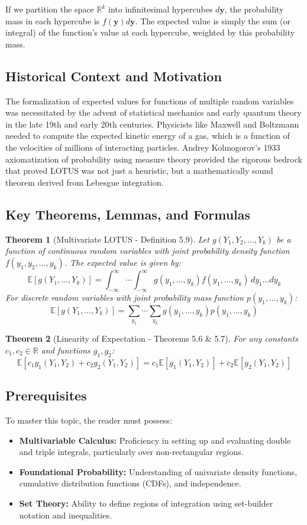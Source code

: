 \documentclass[11pt, a4paper]{article}
\newtheorem{theorem}{Theorem}[section]
\theoremstyle{definition}
\theoremstyle{remark}
\newcommand{\R}{\mathbb{R}}
\newcommand{\E}{\mathbb{E}}
\begin{document}
If we partition the space $\R^k$ into infinitesimal hypercubes $d\mathbf{y}$, the probability mass in each hypercube is $f(\mathbf{y})d\mathbf{y}$. The expected value is simply the sum (or integral) of the function's value at each hypercube, weighted by this probability mass.

\subsection{Historical Context and Motivation}
The formalization of expected values for functions of multiple random variables was necessitated by the advent of statistical mechanics and early quantum theory in the late 19th and early 20th centuries. Physicists like Maxwell and Boltzmann needed to compute the expected kinetic energy of a gas, which is a function of the velocities of millions of interacting particles. Andrey Kolmogorov's 1933 axiomatization of probability using measure theory provided the rigorous bedrock that proved LOTUS was not just a heuristic, but a mathematically sound theorem derived from Lebesgue integration.

\subsection{Key Theorems, Lemmas, and Formulas}
\begin{theorem}[Multivariate LOTUS - Definition 5.9]
Let $g(Y_1, Y_2, \dots, Y_k)$ be a function of continuous random variables with joint probability density function $f(y_1, y_2, \dots, y_k)$. The expected value is given by:
\[
\E[g(Y_1, \dots, Y_k)] = \int_{-\infty}^{\infty} \cdots \int_{-\infty}^{\infty} g(y_1, \dots, y_k) f(y_1, \dots, y_k) \, dy_1 \dots dy_k
\]
For discrete random variables with joint probability mass function $p(y_1, \dots, y_k)$:
\[
\E[g(Y_1, \dots, Y_k)] = \sum_{y_1} \cdots \sum_{y_k} g(y_1, \dots, y_k) p(y_1, \dots, y_k)
\]
\end{theorem}

\begin{theorem}[Linearity of Expectation - Theorems 5.6 \& 5.7]
For any constants $c_1, c_2 \in \R$ and functions $g_1, g_2$:
\[
\E[c_1 g_1(Y_1, Y_2) + c_2 g_2(Y_1, Y_2)] = c_1 \E[g_1(Y_1, Y_2)] + c_2 \E[g_2(Y_1, Y_2)]
\]
\end{theorem}

\subsection{Prerequisites}
To master this topic, the reader must possess:
\begin{itemize}
    \item \textbf{Multivariable Calculus:} Proficiency in setting up and evaluating double and triple integrals, particularly over non-rectangular regions.
    \item \textbf{Foundational Probability:} Understanding of univariate density functions, cumulative distribution functions (CDFs), and independence.
    \item \textbf{Set Theory:} Ability to define regions of integration using set-builder notation and inequalities.
\end{itemize}
\end{document}
